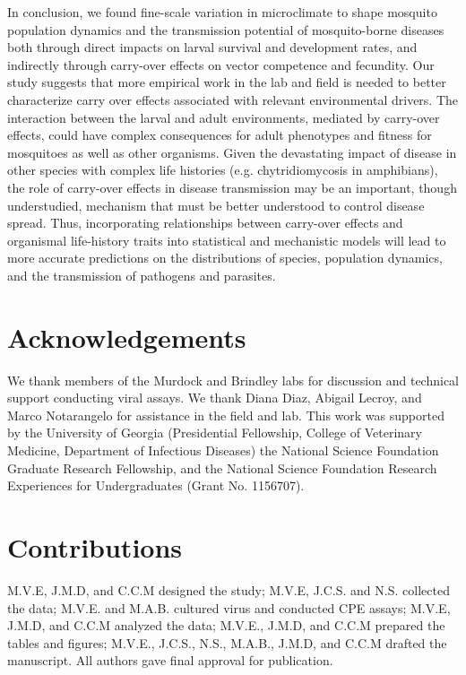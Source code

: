 \documentclass[12pt]{article}
\begin{document}
In conclusion, we found fine-scale variation in microclimate to shape mosquito population dynamics and the transmission potential of mosquito-borne diseases both through direct impacts on larval survival and development rates, and indirectly through carry-over effects on vector competence and fecundity. Our study suggests that more empirical work in the lab and field is needed to better characterize carry over effects associated with relevant environmental drivers. The interaction between the larval and adult environments, mediated by carry-over effects, could have complex consequences for adult phenotypes and fitness for mosquitoes as well as other organisms. Given the devastating impact of disease in other species with complex life histories (e.g. chytridiomycosis in amphibians), the role of carry-over effects in disease transmission may be an important, though understudied, mechanism that must be better understood to control disease spread. Thus, incorporating relationships between carry-over effects and organismal life-history traits into statistical and mechanistic models will lead to more accurate predictions on the distributions of species, population dynamics, and the transmission of pathogens and parasites.

\section{Acknowledgements}
We thank members of the Murdock and Brindley labs for discussion and technical support conducting viral assays. We thank Diana Diaz, Abigail Lecroy, and Marco Notarangelo for assistance in the field and lab. This work was supported by the University of Georgia (Presidential Fellowship, College of Veterinary Medicine, Department of Infectious Diseases) the National Science Foundation Graduate Research Fellowship, and the National Science Foundation Research Experiences for Undergraduates (Grant No. 1156707).

\section{Contributions}
M.V.E, J.M.D, and C.C.M designed the study; M.V.E, J.C.S. and N.S. collected the data; M.V.E. and M.A.B. cultured virus and conducted CPE assays; M.V.E, J.M.D, and C.C.M analyzed the data; M.V.E., J.M.D, and C.C.M prepared the tables and figures; M.V.E., J.C.S., N.S., M.A.B., J.M.D, and C.C.M drafted the manuscript. All authors gave final approval for publication.
\end{document}
